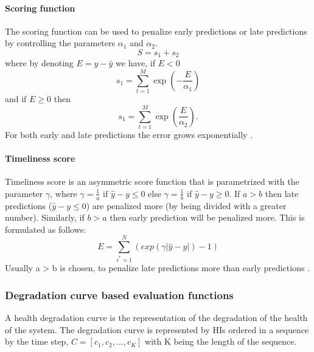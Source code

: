 \paragraph{Scoring function}

The scoring function can be used to penalize early predictions or late
predictions by controlling the parameters $\alpha_1$ and
$\alpha_2$.
\begin{equation}
    S=s_1+s_2
\end{equation}
where by denoting $E = y-\hat{y}$ we have, if $E<0$
\begin{equation}
    s_1 = \sum^M_{t=1} \exp{\left(-\frac{E}{\alpha_1}\right)}
\end{equation}
and if $E \geq 0$ then
\begin{equation}
    s_1 = \sum^M_{t=1} \exp{\left(\frac{E}{\alpha_2}\right)}.
\end{equation}
For both early and late predictions the error grows exponentially
\cite{Mutunga2019HealthIndexBP}.



\paragraph{Timeliness score}
Timeliness score is an asymmetric score function that is parametrized with the parameter $\gamma$,
where $\gamma = \frac{1}{a}$ if $\hat{y} - y \leq 0$ else $\gamma = \frac{1}{b} $ if $\hat{y} - y \geq 0$. If $a>b$ then late predictions ($\hat{y} - y \leq 0$) are penalized
more (by being divided with a greater number). Similarly, if $b>a$ then early prediction
will be penalized more.
This is formulated as follows:
\begin{equation}
    E = \sum_{i^* =1}^N (exp(\gamma |\hat{y} - y|)-1)
\end{equation}
Usually a > b is chosen, to
penalize late predictions more than early predictions \cite{DBLP:journals/corr/MalhotraTRAVAS16}.




\subsubsection{Degradation curve based evaluation functions}

A health degradation curve is the representation of the degradation of the health of the system.
The degradation curve is represented by HIs ordered in a sequence by the time step,
$C = [c_1, c_2, \dots ,c_K]$ with K
being the length of the sequence.


